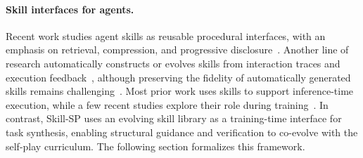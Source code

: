 \paragraph{Skill interfaces for agents.}
Recent work studies agent skills as reusable procedural interfaces, with an emphasis on retrieval, compression, and progressive disclosure~\citep{ling2026agent,jiang2026sok,cho2026skillret,li2026skillsinjector,huang2026persistent,gao2026skillreducer,chen2026skilljuror,chen2026skill,he2026gems}. Another line of research automatically constructs or evolves skills from interaction traces and execution feedback~\citep{mi2026procmem,liu2026harnessing,wang2026skillx,shen2026skillfoundry,yang2026skillmaster,liu2026skillrevise,gautam2026skillaxe,wang2026skillgrad,liu2026skillsvote,ni2026trace2skill}, although preserving the fidelity of automatically generated skills remains challenging~\citep{li2026skillsbench,zhong2026skilllearnbench,zhou2026skillgenbench}. Most prior work uses skills to support inference-time execution, while a few recent studies explore their role during training~\citep{lu2026skill0}. In contrast, Skill-SP uses an evolving skill library as a training-time interface for task synthesis, enabling structural guidance and verification to co-evolve with the self-play curriculum. The following section formalizes this framework.